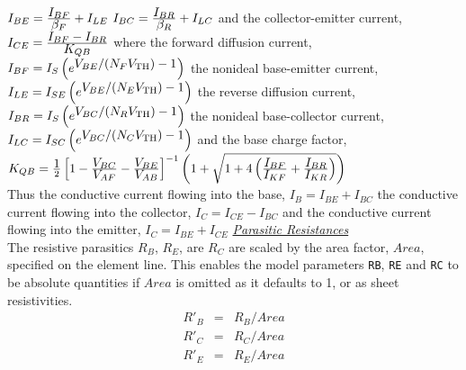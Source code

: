 $I_{BE} = {{\textstyle I_{BF} } \over {\textstyle \beta_F }} + I_{LE}$\inlineeq
{}
$I_{BC} = {{\textstyle I_{BR} } \over {\textstyle \beta_R }} + I_{LC}$\inlineeq
and the collector-emitter current,
$I_{CE} = {{\textstyle I_{BF} - I_{BR} } \over {\textstyle K_{QB} }}$\inlineeq
where the forward diffusion current,
$I_{BF} = I_S\left(e^{\textstyle V_{BE}/(N_F V_{\mbox{\scriptsize TH}}) - 1} \right)$\inlineeq
the nonideal base-emitter current,
$I_{LE}=I_{SE}\left(e^{\textstyle V_{BE}/(N_E V_{\mbox{\scriptsize TH}}) - 1} \right)$\inlineeq
the reverse diffusion current,
$I_{BR} = I_S\left(e^{\textstyle V_{BC}/(N_R V_{\mbox{\scriptsize TH}}) - 1} \right)$\inlineeq
the nonideal base-collector current,
$I_{LC}=I_{SC}\left(e^{\textstyle V_{BC}/(N_C V_{\mbox{\scriptsize TH}}) - 1} \right)$\inlineeq
and the base charge factor,
$K_{QB} = {{\textstyle 1}\over{2}} \left[1 -
    {{\textstyle V_{BC}}\over{\textstyle V_{AF}}}-
         {{\textstyle V_{BE}}\over{\textstyle V_{AB}}}
    \right]^{-1} \left(1 + \sqrt{1 + 4\left(
        {{\textstyle I_{BF}}\over{\textstyle I_{KF}}}+
         {{\textstyle I_{BR}}\over{\textstyle I_{KR}}}
        \right)}\right)$\\\inlineeq
Thus the conductive current flowing into the base,
$I_B = I_{BE}+I_{BC}$\inlineeq
the conductive current flowing into the collector,
$I_C = I_{CE}-I_{BC}$\inlineeq
and the conductive current flowing into the emitter,
$I_C = I_{BE}+I_{CE}$\inlineeq
\vspace{0.1in}
\noindent\underline{\sl \large Parasitic Resistances}\\[0.1in]
The resistive parasitics $R_B$, $R_E$, are $R_C$ are scaled by the area
factor, $Area$, specified on the element line.  This enables the model
parameters {\tt RB}, {\tt RE} and {\tt RC} to be absolute quantities
if $Area$ is omitted as it defaults to 1, or as sheet resistivities.
\begin{eqnarray}
R'_B & = & R_B/Area\\
R'_C & = & R_C/Area\\
R'_E & = & R_E/Area
\end{eqnarray}
